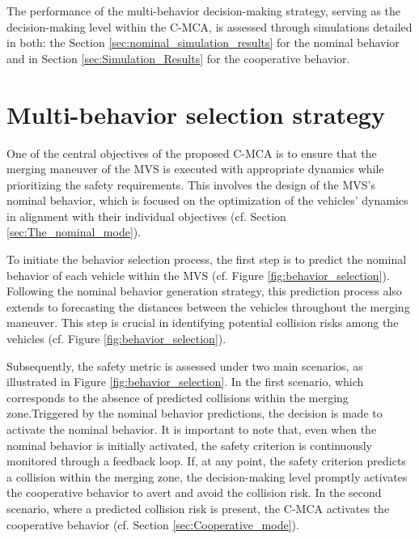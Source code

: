 The performance of the multi-behavior decision-making strategy, serving as the decision-making level within the C-MCA, is assessed through simulations detailed in both: the Section \ref{sec:nominal_simulation_results} for the nominal behavior and in Section \ref{sec:Simulation_Results} for the cooperative behavior. 



 \section{Multi-behavior selection strategy}\label{sec:Multi-behavior_selection_strategy}










One of the central objectives of the proposed C-MCA is to ensure that the merging maneuver of the MVS is executed with appropriate dynamics while prioritizing the safety requirements. This involves the design of the MVS's nominal behavior, which is focused on the optimization of the vehicles' dynamics in alignment with their individual objectives (cf. Section \ref{sec:The_nominal_mode}). 

To initiate the behavior selection process, the first step is to predict the nominal behavior of each vehicle within the MVS (cf. Figure \ref{fig:behavior_selection}). Following the nominal behavior generation strategy, this prediction process also extends to forecasting the distances between the vehicles throughout the merging maneuver. This step is crucial in identifying potential collision risks among the vehicles (cf. Figure \ref{fig:behavior_selection}). 





Subsequently, the safety metric is assessed under two main scenarios, as illustrated in Figure \ref{fig:behavior_selection}. In the first scenario, which corresponds to the absence of predicted collisions within the merging zone.Triggered by the nominal behavior predictions, the decision is made to activate the nominal behavior. It is important to note that, even when the nominal behavior is initially activated, the safety criterion is continuously monitored through a feedback loop. If, at any point, the safety criterion predicts a collision within the merging zone, the decision-making level promptly activates the cooperative behavior to avert and avoid the collision risk. In the second scenario, where a predicted collision risk is present, the C-MCA activates the cooperative behavior (cf. Section \ref{sec:Cooperative_mode}). 


